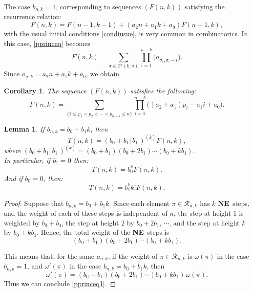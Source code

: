\documentclass[12pt,a4paper]{article}
\newtheorem{corollary}[theorem]{Corollary}%
\newtheorem{lemma}[theorem]{Lemma}%
\theoremstyle{definition} %
\theoremstyle{remark}
\theoremstyle{examples}
\newcommand{\cheg}{\mathcal{R}_{n,k}}
\newcommand{\suit}[1]{{#1}(n,k)}
\newcommand{\cou}[3]{#1_{#2,#3}}
\newcommand{\argtgen}[3]{(#1|#2)^{(\overline{#3})}}
\newcommand{\nes}{\textbf{NE}}
\newcommand{\coss}{\cdots}
\begin{document}
The case $b_{n,k}=1$, corresponding to sequences $(F(n,k))$ satisfying the recurrence relation:
\begin{equation}\label{bbbcas}
	F(n,k) = F(n-1,k-1) + (a_2n+a_1k+a_0) F(n-1,k),
\end{equation}
with the usual initial conditions \eqref{condiusue}, is very common in combinatorics. In this case, \eqref{pprinceq} becomes 
	\begin{equation}\label{eqqq11}
	\suit{F}
	=\sum_{\sigma \in \mathcal{C}^\uparrow(k,n)}
	\prod_{i=1}^{n-k} \big( \cou{a}{\tilde{\sigma}_i}{\tilde{\sigma}_i-i} \big).
\end{equation}
Since $a_{n,k}=a_2n+a_1k+a_0$, we obtain 
\begin{corollary}\label{cor11} The sequence $(F(n,k))$ satisfies the following:
	\begin{equation}\label{formprinc}
		\suit{F}= \sum_{\{1\leq p_1<p_2<\coss <p_{n-k}\leq n\}}  
		\prod_{i=1}^{n-k} \Big( (a_2+a_1)p_i-a_1i+a_0 \Big).
	\end{equation} 
\end{corollary}



	\begin{lemma}\label{cor1} If $b_{n,k}=b_0+b_1k$, then 
		\begin{equation}\label{pprinceq1}
		\suit{T}
		=\argtgen{b_0 + b_1}{\, b_1 \,}{k}F(n,k),
		\end{equation} where  $\argtgen{b_0 + b_1}{\, b_1 \,}{k}= (b_0+b_1)(b_0+2b_1)\cdots(b_0+kb_1)$.\\
		In particular, if $b_1=0$ then: 
		\begin{equation}\label{pprinceq2}
		\suit{T}=b_0^k F(n,k).
		\end{equation}
		And if $b_0=0$, then:
		\begin{equation}\label{pprinceq3}
		\suit{T}=b_1^k k! F(n,k).
		\end{equation} 
		\end{lemma}
\begin{proof}
	Suppose that $b_{n,k} = b_0 + b_1 k$. Since each element $\pi \in \mathcal{R}_{n,k}$ has $k$ \nes\ steps, and the weight of each of these steps is independent of $n$, the step at height $1$ is weighted by $b_0 + b_1$, the step at height $2$ by $b_0 + 2b_1$, $\cdots$, and the step at height $k$ by $b_0 + k b_1$. Hence, the total weight of the \nes\ steps is
	\[
	(b_0 + b_1)(b_0 + 2b_1)\cdots(b_0 + k b_1).
	\]
	
	\noindent This means that, for the same $a_{n,k}$, if the weight of $\pi \in \cheg$ is $\omega(\pi)$ in the case $b_{n,k} = 1$, and $\omega'(\pi)$ in the case $b_{n,k} = b_0 + b_1 k$, then
	\[
	\omega'(\pi) = (b_0 + b_1)(b_0 + 2b_1)\cdots(b_0 + k b_1)\,\omega(\pi).
	\] Thus we can conclude \eqref{pprinceq1}.
\end{proof}
\end{document}
